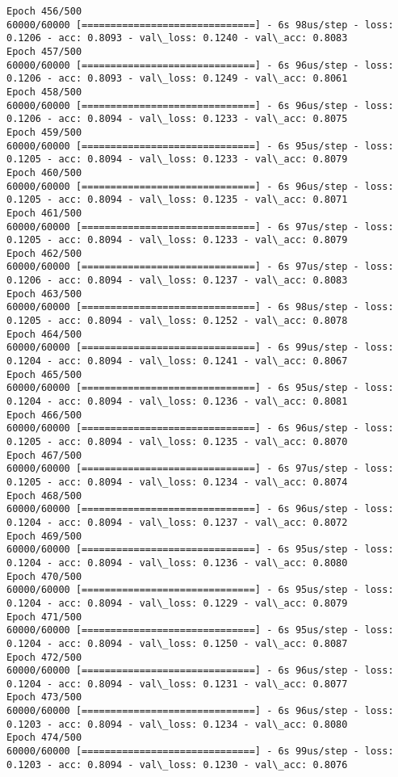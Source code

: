 \documentclass[11pt]{article}
\begin{document}
\begin{Verbatim}[commandchars=\\\{\}]
Epoch 456/500
60000/60000 [==============================] - 6s 98us/step - loss: 0.1206 - acc: 0.8093 - val\_loss: 0.1240 - val\_acc: 0.8083
Epoch 457/500
60000/60000 [==============================] - 6s 96us/step - loss: 0.1206 - acc: 0.8093 - val\_loss: 0.1249 - val\_acc: 0.8061
Epoch 458/500
60000/60000 [==============================] - 6s 96us/step - loss: 0.1206 - acc: 0.8094 - val\_loss: 0.1233 - val\_acc: 0.8075
Epoch 459/500
60000/60000 [==============================] - 6s 95us/step - loss: 0.1205 - acc: 0.8094 - val\_loss: 0.1233 - val\_acc: 0.8079
Epoch 460/500
60000/60000 [==============================] - 6s 96us/step - loss: 0.1205 - acc: 0.8094 - val\_loss: 0.1235 - val\_acc: 0.8071
Epoch 461/500
60000/60000 [==============================] - 6s 97us/step - loss: 0.1205 - acc: 0.8094 - val\_loss: 0.1233 - val\_acc: 0.8079
Epoch 462/500
60000/60000 [==============================] - 6s 97us/step - loss: 0.1206 - acc: 0.8094 - val\_loss: 0.1237 - val\_acc: 0.8083
Epoch 463/500
60000/60000 [==============================] - 6s 98us/step - loss: 0.1205 - acc: 0.8094 - val\_loss: 0.1252 - val\_acc: 0.8078
Epoch 464/500
60000/60000 [==============================] - 6s 99us/step - loss: 0.1204 - acc: 0.8094 - val\_loss: 0.1241 - val\_acc: 0.8067
Epoch 465/500
60000/60000 [==============================] - 6s 95us/step - loss: 0.1204 - acc: 0.8094 - val\_loss: 0.1236 - val\_acc: 0.8081
Epoch 466/500
60000/60000 [==============================] - 6s 96us/step - loss: 0.1205 - acc: 0.8094 - val\_loss: 0.1235 - val\_acc: 0.8070
Epoch 467/500
60000/60000 [==============================] - 6s 97us/step - loss: 0.1205 - acc: 0.8094 - val\_loss: 0.1234 - val\_acc: 0.8074
Epoch 468/500
60000/60000 [==============================] - 6s 96us/step - loss: 0.1204 - acc: 0.8094 - val\_loss: 0.1237 - val\_acc: 0.8072
Epoch 469/500
60000/60000 [==============================] - 6s 95us/step - loss: 0.1204 - acc: 0.8094 - val\_loss: 0.1236 - val\_acc: 0.8080
Epoch 470/500
60000/60000 [==============================] - 6s 95us/step - loss: 0.1204 - acc: 0.8094 - val\_loss: 0.1229 - val\_acc: 0.8079
Epoch 471/500
60000/60000 [==============================] - 6s 95us/step - loss: 0.1204 - acc: 0.8094 - val\_loss: 0.1250 - val\_acc: 0.8087
Epoch 472/500
60000/60000 [==============================] - 6s 96us/step - loss: 0.1204 - acc: 0.8094 - val\_loss: 0.1231 - val\_acc: 0.8077
Epoch 473/500
60000/60000 [==============================] - 6s 96us/step - loss: 0.1203 - acc: 0.8094 - val\_loss: 0.1234 - val\_acc: 0.8080
Epoch 474/500
60000/60000 [==============================] - 6s 99us/step - loss: 0.1203 - acc: 0.8094 - val\_loss: 0.1230 - val\_acc: 0.8076

\end{Verbatim}
\end{document}
